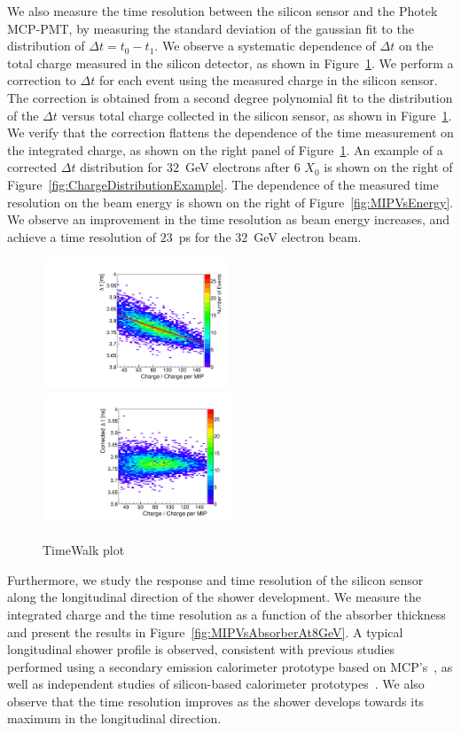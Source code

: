 \documentclass[12pt]{article}
\begin{document}
{We also measure the time resolution between the silicon sensor and the Photek
MCP-PMT, by measuring the standard deviation of the gaussian fit to the
distribution of $\Delta t = t_0-t_1$. We observe a systematic dependence of
$\Delta t$ on the total charge measured in the silicon detector, as shown in
Figure~\ref{fig:timewalk}. We perform a correction to $\Delta t$ for each event
using the measured charge in the silicon sensor. The correction is obtained from
a second degree polynomial fit to the distribution of the $\Delta t$ versus
total charge collected in the silicon sensor, as shown in
Figure~\ref{fig:timewalk}. We verify that the correction flattens the dependence
of the time measurement on the integrated charge, as shown on the right panel of
Figure~\ref{fig:timewalk}. An example of a corrected $\Delta t$ distribution for
$32$~GeV electrons after 6 $X_0$ is shown on the right of
Figure~\ref{fig:ChargeDistributionExample}. The dependence of the measured time
resolution on the beam energy is shown on the right of
Figure~\ref{fig:MIPVsEnergy}. We observe an improvement in the time resolution
as beam energy increases, and achieve a time resolution of $23$~ps for the
$32$~GeV electron beam.

\begin{figure}[htbp] 
\centering
\includegraphics[width=0.49\textwidth]{plots/DeltaT_vs_Charge_Uncorrected.pdf} 
\includegraphics[width=0.5\textwidth]{plots/DeltaT_vs_Charge_Corrected.pdf} 
\caption{TimeWalk plot} 
\label{fig:timewalk} 
\end{figure} 

Furthermore, we study the response and time resolution of the silicon sensor
along the longitudinal direction of the shower development. We measure the
integrated charge and the time resolution as a function of the absorber
thickness and present the results in Figure~\ref{fig:MIPVsAbsorberAt8GeV}. A
typical longitudinal shower profile is observed, consistent with previous
studies performed using a secondary emission calorimeter prototype based on
MCP's~\cite{MCPShowerMaxPaper}, as well as independent studies of silicon-based
calorimeter prototypes~\cite{Muhuri201424}. We also observe that the time
resolution improves as the shower develops towards its maximum in the
longitudinal direction. 

}
\end{document}
